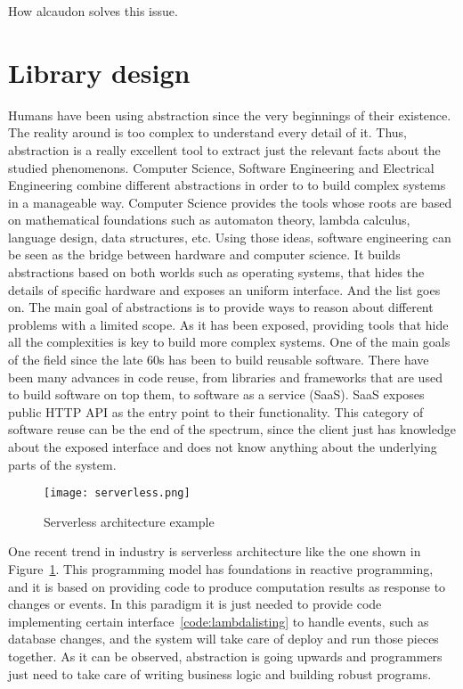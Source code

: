 How alcaudon solves this issue.

\section{Library design}

Humans have been using abstraction since the very beginnings of their existence.
The reality around is too complex to understand every detail of it. Thus,
abstraction is a really excellent tool to extract just the relevant facts about
the studied phenomenons. Computer Science, Software Engineering and Electrical
Engineering combine different abstractions in order to to build complex systems
in a manageable way.
Computer Science provides the tools whose roots are based on mathematical
foundations such as automaton theory, lambda calculus, language design, data
structures, etc.
Using those ideas, software engineering can be seen as the bridge between
hardware and computer science. It builds abstractions based on both worlds such
as operating systems, that hides the details of specific hardware and exposes an
uniform interface. And the list goes on. The main goal of abstractions is to
provide ways to reason about different problems with a limited scope.
As it has been exposed, providing tools that hide all the complexities is key to
build more complex systems. One of the main goals of the field since the late
60s has been to build reusable software\cite{reuse}. There have been many
advances in code reuse, from libraries and frameworks that are used to build
software on top them, to software as a service (SaaS). SaaS exposes public HTTP
API as the entry point to their functionality. This category of software reuse
can be the end of the spectrum, since the client just has knowledge about
the exposed interface and does not know anything about the underlying parts of the
system.

\begin{figure}[!h]
\begin{center}
\texttt{[image: serverless.png]}
\caption{Serverless architecture example\cite{awsserverless}}
\label{fig:serverless}
\end{center}
\end{figure}

One recent trend in industry is serverless architecture like the one shown in
Figure~\ref{fig:serverless}. This programming model has foundations in reactive
programming, and it is based on providing code to produce computation results as
response to changes or events. In this paradigm it is just needed to provide
code implementing certain interface~\ref{code:lambdalisting} to handle events,
such as database changes, and the system will take care of deploy and run those
pieces together. As it can be observed, abstraction is going upwards and
programmers just need to take care of writing business logic and building
robust programs.

